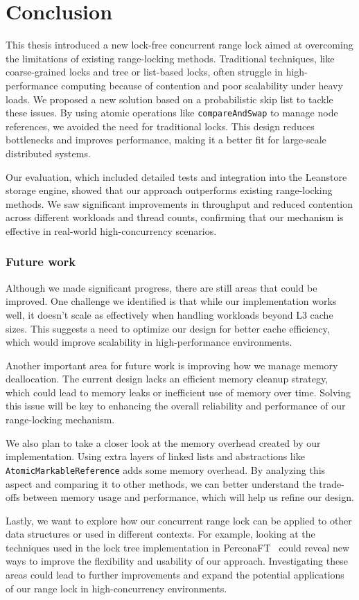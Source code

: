 \chapter{Conclusion}\label{chapter}

This thesis introduced a new lock-free concurrent range lock aimed at overcoming the limitations of existing range-locking methods. Traditional techniques, like coarse-grained locks and tree or list-based locks, often struggle in high-performance computing because of contention and poor scalability under heavy loads. We proposed a new solution based on a probabilistic skip list to tackle these issues. By using atomic operations like \texttt{compareAndSwap} to manage node references, we avoided the need for traditional locks. This design reduces bottlenecks and improves performance, making it a better fit for large-scale distributed systems.

Our evaluation, which included detailed tests and integration into the Leanstore storage engine, showed that our approach outperforms existing range-locking methods. We saw significant improvements in throughput and reduced contention across different workloads and thread counts, confirming that our mechanism is effective in real-world high-concurrency scenarios.

\subsection*{Future work}

Although we made significant progress, there are still areas that could be improved. One challenge we identified is that while our implementation works well, it doesn't scale as effectively when handling workloads beyond L3 cache sizes. This suggests a need to optimize our design for better cache efficiency, which would improve scalability in high-performance environments.

Another important area for future work is improving how we manage memory deallocation. The current design lacks an efficient memory cleanup strategy, which could lead to memory leaks or inefficient use of memory over time. Solving this issue will be key to enhancing the overall reliability and performance of our range-locking mechanism.

We also plan to take a closer look at the memory overhead created by our implementation. Using extra layers of linked lists and abstractions like \texttt{AtomicMarkableReference} adds some memory overhead. By analyzing this aspect and comparing it to other methods, we can better understand the trade-offs between memory usage and performance, which will help us refine our design.

Lastly, we want to explore how our concurrent range lock can be applied to other data structures or used in different contexts. For example, looking at the techniques used in the lock tree implementation in PerconaFT~\parencite{perconaft} could reveal new ways to improve the flexibility and usability of our approach. Investigating these areas could lead to further improvements and expand the potential applications of our range lock in high-concurrency environments.